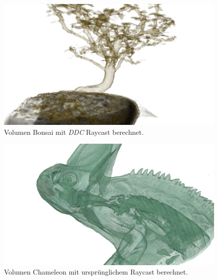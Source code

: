 \begin{landscape}
	\begin{figure}
		\centering
		\includegraphics[width=1\textheight]{../../Grafiken/results/picture_quality/bonsai/DDC_img-1_ray-1-5.png}
		\caption{Volumen Bonsai mit \emph{DDC} Raycast berechnet.}
		\label{fig::res::bon_ddc}
	\end{figure}
\end{landscape}


\begin{landscape}
	\begin{figure}
		\centering
		\includegraphics[width=1\textheight]{../../Grafiken/results/picture_quality/chameleon/Standard_img-1_Ray-1-5.png}
		\caption{Volumen Chameleon mit ursprünglichem Raycast berechnet.}
		\label{fig::res::cam_st}
	\end{figure}
\end{landscape}

